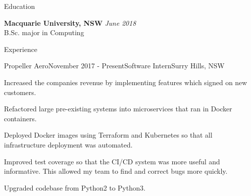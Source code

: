 \documentclass{resume} %
\begin{document}

\begin{rSection}{Education}

{\bf Macquarie University, NSW} \hfill {\em June 2018} \\ 
B.Sc. major in Computing \\

\end{rSection}


\begin{rSection}{Experience}

\begin{rSubsection}{Propeller Aero}{November 2017 - Present}{Software Intern}{Surry Hills, NSW}
\item Increased the companies revenue by implementing features which signed on new customers.
\item Refactored large pre-existing systems into microservices that ran in Docker containers. 
\item Deployed Docker images using Terraform and Kubernetes so that all infrastructure deployment was automated. 
\item Improved test coverage so that the CI/CD system was more useful and informative. This allowed my team to find and correct bugs more quickly.
\item Upgraded codebase from Python2 to Python3.
\end{rSubsection}

\end{rSection}

\end{document}
